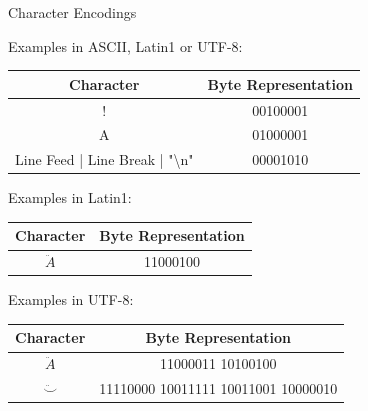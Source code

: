\documentclass[
	11pt, 
]{beamer}
\begin{document}
\begin{frame}{Character Encodings}

Examples in ASCII, Latin1 or UTF-8:

\begin{center}
\vspace{.1cm}
\begin{tabular}{|c|c|}
\hline
Character & Byte Representation \\
\hline
! & 00100001 \\
A & 01000001 \\
Line Feed | Line Break | "\textbackslash{}n" & 00001010 \\
\hline
\end{tabular}
\end{center}

Examples in Latin1:

\begin{center}
\vspace{.1cm}
\renewcommand{\arraystretch}{1.3}
\begin{tabular}{|c|c|}
\hline
Character & Byte Representation \\
\hline
$\ddot{A}$ & 11000100 \\
\hline
\end{tabular}
\end{center}

Examples in UTF-8:

\begin{center}
\vspace{.1cm}
\renewcommand{\arraystretch}{1.3}
\begin{tabular}{|c|c|}
\hline
Character & Byte Representation \\
\hline
$\ddot{A}$ & 11000011 10100100 \\
$\ddot\smile$ & 11110000 10011111 10011001 10000010 \\
\hline
\end{tabular}
\end{center}
    
\end{frame}

\end{document}
